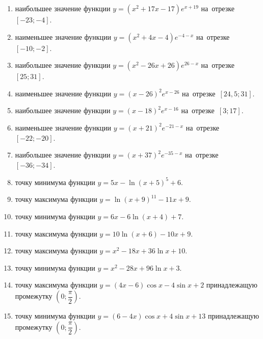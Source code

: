 \documentclass[a4paper,10pt]{article}
\begin{document}
\begin{enumerate}
\item {} наибольшее значение функции $y=\left(x^2 +17x -17\right)e^{x+19}$ на~отрезке~$\left[-23;-4\right]$.

\item {} наименьшее значение функции $y=\left(x^2 +4x -4\right)e^{-4-x}$ на~отрезке~$\left[-10;-2\right]$.

\item {} наибольшее значение функции $y=\left(x^2 -26x +26\right)e^{26-x}$ на~отрезке~$\left[25;31\right]$.

\item {} наименьшее значение функции $y=\left(x-26\right)^2e^{x-26}$ на~отрезке~$\left[24,5;31\right]$.

\item {} наибольшее значение функции $y=\left(x-18\right)^2e^{x-16}$ на~отрезке~$\left[3;17\right]$.

\item {} наименьшее значение функции $y=\left(x+21\right)^2e^{-21-x}$ на~отрезке~$\left[-22;-20\right]$.

\item {} наибольшее значение функции $y=\left(x+37\right)^2e^{-35-x}$ на~отрезке~$\left[-36;-34\right]$.

\item {} точку минимума функции $y=5x-\ln\left(x+5\right)^{5}+6$.

\item {} точку максимума функции $y=\ln\left(x+9\right)^{11}-11x+9$.

\item {} точку минимума функции $y=6x-6\ln\left(x+4\right)+7$.

\item {} точку максимума функции $y=10\ln\left(x+6\right)-10x+9$.

\item {} точку максимума функции $y=x^2-18x+36\ln x +10$.

\item {} точку минимума функции $y=x^2-28x+96\ln x +3$.

\item {} точку максимума функции $y=\left(4x-6\right)\cos x -4\sin x+2$
принадлежащую промежутку $\left(0;\dfrac{\pi}{2}\right)$.

\item {} точку минимума функции $y=\left(6-4x\right)\cos x +4\sin x+13$
принадлежащую промежутку $\left(0;\dfrac{\pi}{2}\right)$.


\end{enumerate}
\end{document}
